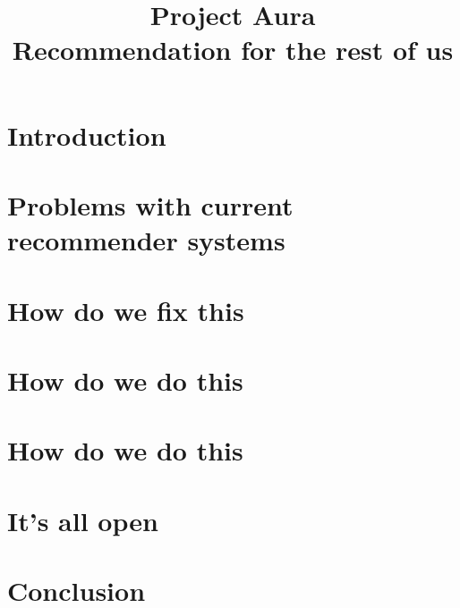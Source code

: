 \documentclass{article}
\title{Project Aura \\ Recommendation for the rest of us}
\begin{document}
%
\maketitle

\section{Introduction}

\section{Problems with current recommender systems}

\section{How do we fix this}


\section{How do we do this}
\section{How do we do this}

\section{It's all open}

\section{Conclusion}
\end{document}
